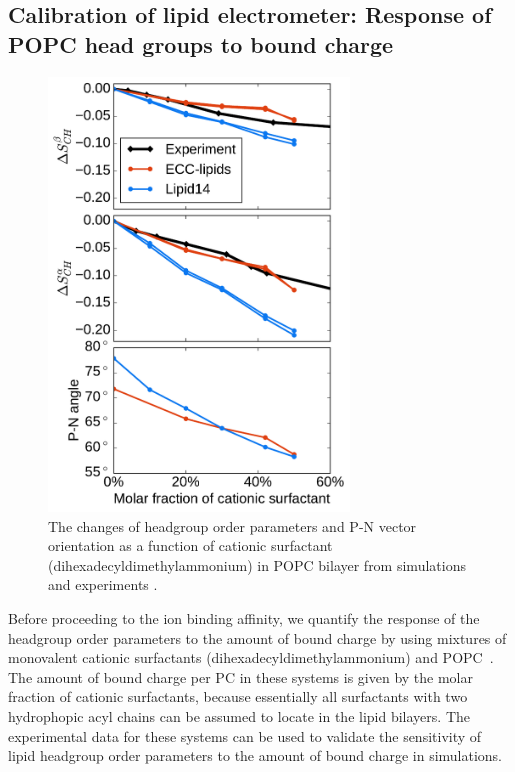 \documentclass[aip,jcp,twocolumn]{revtex4}
\begin{document}

\subsection{Calibration of lipid electrometer:
            Response of POPC head groups to bound charge}\label{section:boundCHARGE}

\begin{figure}[tb!]
  \centering
  \includegraphics[width=8.0cm]{../Fig/ipython_nb/PN_angle_OrdPars-A-B_L14-ECCL17_q80_sig89_surf.pdf}
  \caption{\label{OrderParameterCHANGESsurf}
    The changes of headgroup order parameters and P-N vector orientation as a function of
    cationic surfactant (dihexadecyldimethylammonium) in POPC bilayer from simulations
    and experiments \cite{scherer89}.
  }
\end{figure}

Before proceeding to the ion binding affinity, we quantify
the response of the headgroup order parameters to the amount of 
bound charge by using mixtures of monovalent cationic
surfactants (dihexadecyldimethylammonium)
and POPC~\cite{scherer89}. The amount of bound charge per PC 
in these systems is given by the molar fraction of cationic 
surfactants, because essentially all surfactants with two hydrophopic
acyl chains can be assumed to locate in the lipid bilayers.
The experimental data for these systems can be used to validate 
the sensitivity of lipid headgroup order parameters
to the amount of bound charge in simulations.
\end{document}
